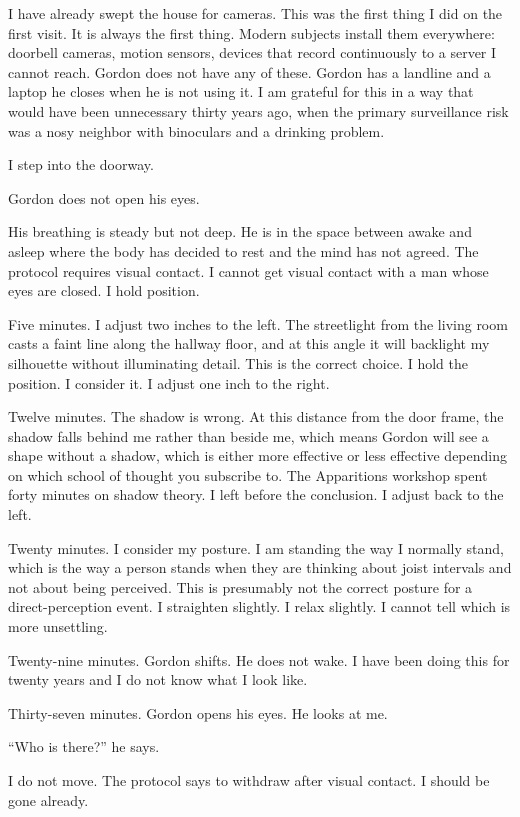 I have already swept the house for cameras. This was the first thing I did on the first visit. It is always the first thing. Modern subjects install them everywhere: doorbell cameras, motion sensors, devices that record continuously to a server I cannot reach. Gordon does not have any of these. Gordon has a landline and a laptop he closes when he is not using it. I am grateful for this in a way that would have been unnecessary thirty years ago, when the primary surveillance risk was a nosy neighbor with binoculars and a drinking problem.

I step into the doorway.

Gordon does not open his eyes.

His breathing is steady but not deep. He is in the space between awake and asleep where the body has decided to rest and the mind has not agreed. The protocol requires visual contact. I cannot get visual contact with a man whose eyes are closed. I hold position.

Five minutes. I adjust two inches to the left. The streetlight from the living room casts a faint line along the hallway floor, and at this angle it will backlight my silhouette without illuminating detail. This is the correct choice. I hold the position. I consider it. I adjust one inch to the right.

Twelve minutes. The shadow is wrong. At this distance from the door frame, the shadow falls behind me rather than beside me, which means Gordon will see a shape without a shadow, which is either more effective or less effective depending on which school of thought you subscribe to. The Apparitions workshop spent forty minutes on shadow theory. I left before the conclusion. I adjust back to the left.

Twenty minutes. I consider my posture. I am standing the way I normally stand, which is the way a person stands when they are thinking about joist intervals and not about being perceived. This is presumably not the correct posture for a direct-perception event. I straighten slightly. I relax slightly. I cannot tell which is more unsettling.

Twenty-nine minutes. Gordon shifts. He does not wake. I have been doing this for twenty years and I do not know what I look like.

Thirty-seven minutes. Gordon opens his eyes. He looks at me.

``Who is there?'' he says.

I do not move. The protocol says to withdraw after visual contact. I should be gone already.

